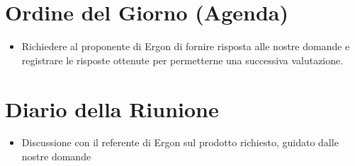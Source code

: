 \documentclass[a4paper, 11pt, oneside]{scrartcl} %
\begin{document}
\section{Ordine del Giorno (Agenda)}
\begin{itemize}
    \item Richiedere al proponente di Ergon di fornire risposta alle nostre domande e registrare le risposte ottenute per permetterne una successiva valutazione.
\end{itemize}


\newpage
\section{Diario della Riunione}
\begin{itemize}
    \item Discussione con il referente di Ergon sul prodotto richiesto, guidato dalle nostre domande
\end{itemize}
\end{document}
